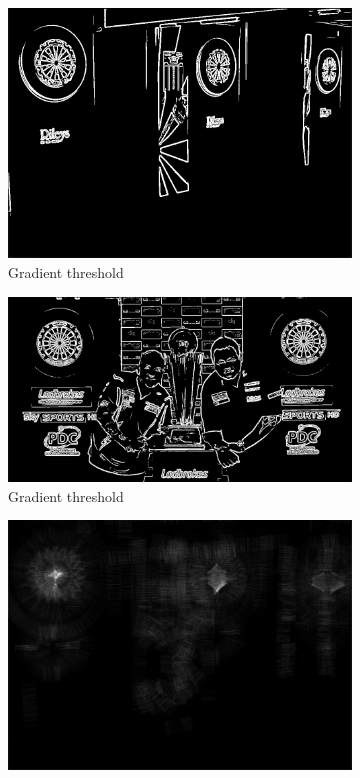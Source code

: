 \documentclass[conference]{IEEEtran}
\begin{document}
\begin{figure}[htb]
\centering
\begin{subfigure}{.5\linewidth}
  \centering
  \includegraphics[width=.9\linewidth]{images/task3/bestthresh.png}
  \caption*{Gradient threshold}
  \label{fig:sub1}
\end{subfigure}%
\begin{subfigure}{.5\linewidth}
  \centering
  \includegraphics[width=.9\linewidth]{images/task3/worstthresh.png}
  \caption*{Gradient threshold}
  \label{fig:sub2}
\end{subfigure}
\begin{subfigure}{.5\linewidth}
  \centering
  \includegraphics[width=.9\linewidth]{images/task3/bestcirclehough.png}

\end{subfigure}
\end{figure}
\end{document}
